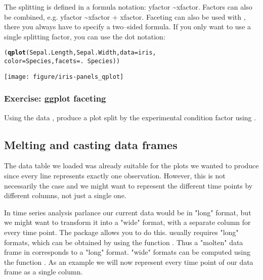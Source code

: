 \documentclass{article}\usepackage[]{graphicx}\usepackage[usenames,dvipsnames]{color}
\makeatletter
\def\maxwidth{ %
  \ifdim\Gin@nat@width>\linewidth
    \linewidth
  \else
    \Gin@nat@width
  \fi
}
\newcommand{\hlopt}[1]{\textcolor[rgb]{0,0,0}{#1}}%
\newcommand{\hlstd}[1]{\textcolor[rgb]{0.345,0.345,0.345}{#1}}%
\newcommand{\hlkwc}[1]{\textcolor[rgb]{0.333,0.667,0.333}{#1}}%
\newcommand{\hlkwd}[1]{\textcolor[rgb]{0.737,0.353,0.396}{\textbf{#1}}}%
\newenvironment{kframe}{%
 \def\at@end@of@kframe{}%
 \ifinner\ifhmode%
  \def\at@end@of@kframe{\end{minipage}}%
  \begin{minipage}{\columnwidth}%
 \fi\fi%
 \def\FrameCommand##1{\hskip\@totalleftmargin \hskip-\fboxsep
 \colorbox{shadecolor}{##1}\hskip-\fboxsep
     \hskip-\linewidth \hskip-\@totalleftmargin \hskip\columnwidth}%
 \MakeFramed {\advance\hsize-\width
   \@totalleftmargin\z@ \linewidth\hsize
   \@setminipage}}%
 {\par\unskip\endMakeFramed%
 \at@end@of@kframe}
\newenvironment{knitrout}{}{} %
\makeatother
\begin{document}
The splitting is defined in a formula notation:
yfactor \textasciitilde xfactor. Factors can also be combined,
e.g.  yfactor \textasciitilde xfactor + xfactor. 
Faceting  can also be used with , there you always have
to specify a two--sided formula. If you only want to use a single
splitting factor, you can use the dot notation:

\begin{knitrout}
\color{fgcolor}\begin{kframe}
\begin{alltt}
\hlstd{(}\hlkwd{qplot}\hlstd{(Sepal.Length, Sepal.Width,} \hlkwc{data} \hlstd{= iris,}
\hlkwc{color} \hlstd{= Species,} \hlkwc{facets} \hlstd{= .} \hlopt{~}  \hlstd{Species))}
\end{alltt}
\end{kframe}
\texttt{[image: figure/iris-panels\_qplot]} 

\end{knitrout}


\subsubsection*{Exercise: ggplot faceting}
 
Using the data , 
produce a plot split by the experimental condition factor using 
. 



\subsection{Melting and casting data frames}  

The data table we loaded was already suitable for the plots we wanted 
to produce since every line represents exactly one observation. 
However, this is not necessarily the case and we might want to represent
the different time points by different columns, not just a single one.

In time series analysis parlance our current data would be in "long" format,
but we might want to transform it into a "wide" format, with a separate 
column for every time point. The package  allows 
you to do this.  usually requires "long" formats, which can be
obtained by using the function . Thus a "molten"
data frame in  corresponds to a "long" format.  "wide" formats
can be computed using the function . As an example
we will now represent every time point of our data frame as a single
column. 
\end{document}
